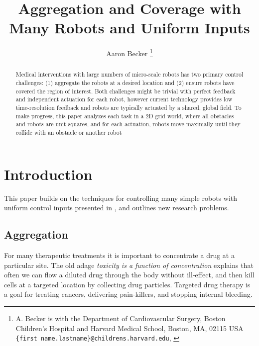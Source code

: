 \documentclass[letterpaper, 10 pt, conference]{ieeeconf}
\begin{document}


\title{\LARGE \bf 
Aggregation and Coverage with Many Robots and Uniform Inputs
}
\author{Aaron Becker%
\thanks{{A. Becker is with the Department of Cardiovascular Surgery,  Boston Children's Hospital and Harvard Medical School, Boston, MA, 02115 USA {\tt\small \{first name.lastname\}@childrens.harvard.edu}, 
}
} %
} %
\maketitle

\begin{abstract}
Medical interventions with large numbers of micro-scale robots has two primary control challenges: (1) aggregate the robots at a desired location and (2) ensure robots have covered the region of interest.  Both challenges might be trivial with perfect feedback and independent actuation for each robot, however current technology provides low time-resolution feedback and robots are typically actuated by a shared, global field.  To make progress, this paper analyzes each task in a 2D grid world, where all obstacles and robots are unit squares, and for each actuation, robots move maximally until they collide with an obstacle or another robot
\end{abstract}




  \section{Introduction}
  
  This paper builds on the techniques for controlling many simple robots with uniform control inputs presented in \cite{Becker2013f,Becker2014,Becker2014a}, and outlines new research problems.
  
  \subsection{Aggregation}\label{sec:Aggregation}
For many therapeutic treatments it is important to concentrate a drug at a particular site.  The old adage \emph{toxicity is a function of concentration} explains that often we can flow a diluted drug through the body without ill-effect, and then kill cells at a targeted location by collecting drug particles.  Targeted drug therapy is a goal for treating cancers, delivering pain-killers, and stopping internal bleeding.
  
\end{document}
